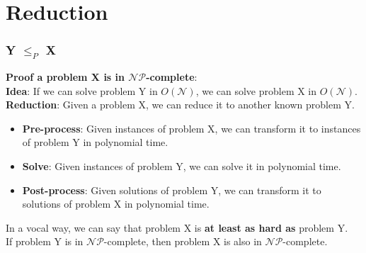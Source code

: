 \documentclass[t]{beamer}
\begin{document}
    \section{Reduction}
        \begin{frame}
            \frametitle{Y $\leq_P$ X}
             \textbf{Proof a problem X is in $\mathcal{NP}$-complete}:\\
             \textbf{Idea}: If we can solve problem Y in $O(\mathcal{N})$, we can solve problem X in $O(\mathcal{N})$.\\
             \textbf{Reduction}: Given a problem X, we can reduce it to another known problem Y.\\
            \begin{itemize}
                \item<4-> \textbf{Pre-process}: Given instances of problem X, we can transform it to instances of problem Y in polynomial time.
                \item<5-> \textbf{Solve}: Given instances of problem Y, we can solve it in polynomial time.
                \item<6-> \textbf{Post-process}: Given solutions of problem Y, we can transform it to solutions of problem X in polynomial time.
            \end{itemize}
            \bigskip
             In a vocal way, we can say that problem X is \textbf{at least as hard as} problem Y.\\
            \bigskip
             If problem Y is in $\mathcal{NP}$-complete, then problem X is also in $\mathcal{NP}$-complete.\\
        \end{frame}

\end{document}
